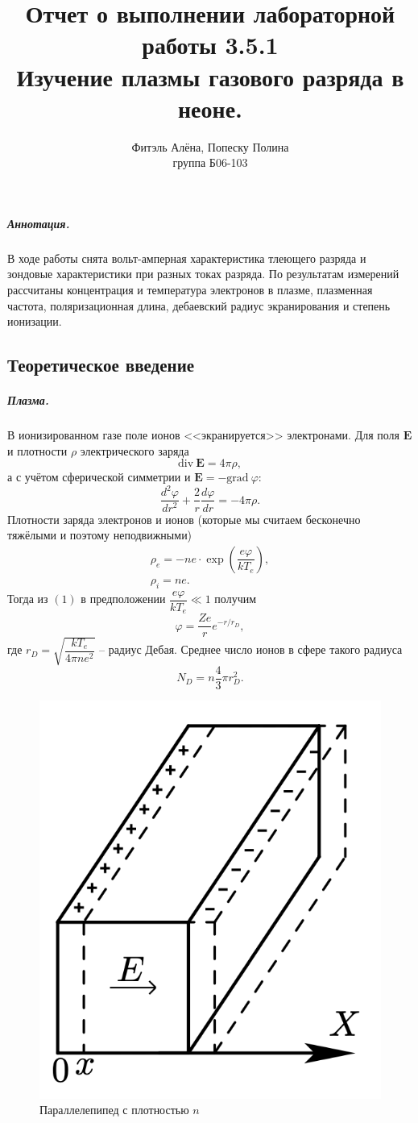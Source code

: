 \documentclass[12pt,a4paper]{article}
\title{
Отчет о выполнении лабораторной работы 3.5.1 \\
Изучение плазмы газового разряда в неоне.}
\author{Фитэль Алёна, Попеску Полина\\ группа Б06-103}
\begin{document}
\maketitle

\subparagraph*{Аннотация.} В ходе работы снята вольт-амперная характеристика тлеющего разряда и зондовые характеристики при разных токах разряда.
По результатам измерений рассчитаны концентрация и температура электронов в плазме, плазменная частота, поляризационная длина, дебаевский радиус экранирования и степень ионизации.

\subsection*{Теоретическое введение}
\subparagraph*{Плазма.}В ионизированном газе поле ионов <<экранируется>> электронами. 
Для поля $\mathbf{E}$ и плотности $\rho$ электрического заряда
\[\text{div}~\mathbf{E} = 4 \pi \rho,\]
а с учётом сферической симметрии и $\mathbf{E} = -\text{grad}~\varphi$:
\begin{equation}
    \dfrac{d^2 \varphi}{dr^2}+\dfrac{2}{r}\dfrac{d\varphi}{dr}=-4\pi \rho.
\end{equation}
Плотности заряда электронов и ионов (которые мы считаем бесконечно тяжёлыми и поэтому неподвижными)
\begin{equation}
    \begin{array}{c}
        \rho_e = -ne \cdot \exp\left(\dfrac{e\varphi}{kT_e}\right),\\
        \rho_i = ne.
    \end{array}
\end{equation}
Тогда из $(1)$ в предположении $\dfrac{e\varphi}{kT_e} \ll 1$ получим
\begin{equation}
    \varphi = \dfrac{Ze}{r}e^{-r/r_D},
\end{equation}
где $r_D = \sqrt{\dfrac{kT_e}{4\pi n e^2}}$ -- радиус Дебая. 
Среднее число ионов в сфере такого радиуса 
\begin{equation}
    N_D = n\dfrac{4}{3}\pi r_D^2.
\end{equation}

\begin{figure}
    \centering
    \includegraphics[width=0.6\linewidth]{1.png}
    \caption{\small{Параллелепипед с плотностью $n$}}
\end{figure}  
\end{document}
